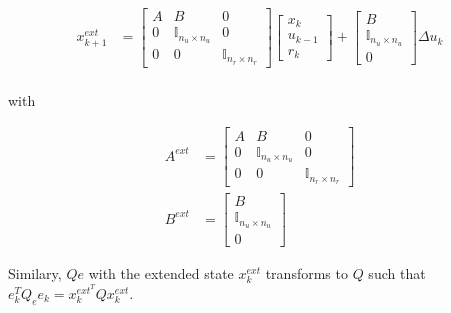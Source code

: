\documentclass{article}
\begin{document}
\begin{equation}
  \begin{aligned}
    x_{k+1}^{ext} &=
    \begin{bmatrix}
      A & B & 0 \\
      0 & \mathbb{I}_{n_u \times n_u} & 0 \\
      0 & 0 & \mathbb{I}_{n_r \times n_r}
    \end{bmatrix}
    \begin{bmatrix}
      x_k \\
      u_{k-1} \\
      r_k
    \end{bmatrix} +
    \begin{bmatrix}
      B \\
      \mathbb{I}_{n_u \times n_u} \\
      0
    \end{bmatrix} \Delta u_k \\
  \end{aligned}
\end{equation}

with

$$
\begin{aligned}
  A^{ext} &=
  \begin{bmatrix}
    A & B & 0 \\
    0 & \mathbb{I}_{n_u \times n_u} & 0 \\
    0 & 0 & \mathbb{I}_{n_r \times n_r}
  \end{bmatrix} \\
  B^{ext} &=
  \begin{bmatrix}
    B \\
    \mathbb{I}_{n_u \times n_u} \\
    0
  \end{bmatrix}
\end{aligned}
$$

Similary, $Qe$ with the extended state $x_k^{ext}$ transforms to $Q$ such that $e_k^T Q_e e_k = x_k^{ext^T} Q x_k^{ext}$.
\end{document}
